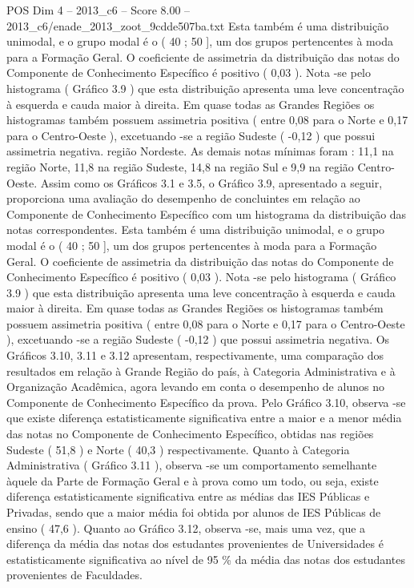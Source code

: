 \begin{textsample}{POS Dim 4 – 2013\_c6 – Score 8.00 – 2013\_c6/enade\_2013\_zoot\_9cdde507ba.txt}
Esta também é uma distribuição unimodal, e o grupo modal é o ( 40 ; 50 ], um dos grupos pertencentes à moda para a Formação Geral.
O coeficiente de assimetria da distribuição das notas do Componente de Conhecimento Específico é positivo ( 0,03 ).
Nota -se pelo histograma ( Gráfico 3.9 ) que esta distribuição apresenta uma leve concentração à esquerda e cauda maior à direita.
Em quase todas as Grandes Regiões os histogramas também possuem assimetria positiva ( entre 0,08 para o Norte e 0,17 para o Centro-Oeste ), excetuando -se a região Sudeste ( -0,12 ) que possui assimetria negativa. região Nordeste.
As demais notas mínimas foram : 11,1 na região Norte, 11,8 na região Sudeste, 14,8 na região Sul e 9,9 na região Centro-Oeste.
Assim como os Gráficos 3.1 e 3.5, o Gráfico 3.9, apresentado a seguir, proporciona uma avaliação do desempenho de concluintes em relação ao Componente de Conhecimento Específico com um histograma da distribuição das notas correspondentes.
Esta também é uma distribuição unimodal, e o grupo modal é o ( 40 ; 50 ], um dos grupos pertencentes à moda para a Formação Geral.
O coeficiente de assimetria da distribuição das notas do Componente de Conhecimento Específico é positivo ( 0,03 ).
Nota -se pelo histograma ( Gráfico 3.9 ) que esta distribuição apresenta uma leve concentração à esquerda e cauda maior à direita.
Em quase todas as Grandes Regiões os histogramas também possuem assimetria positiva ( entre 0,08 para o Norte e 0,17 para o Centro-Oeste ), excetuando -se a região Sudeste ( -0,12 ) que possui assimetria negativa.
Os Gráficos 3.10, 3.11 e 3.12 apresentam, respectivamente, uma comparação dos resultados em relação à Grande Região do país, à Categoria Administrativa e à Organização Acadêmica, agora levando em conta o desempenho de alunos no Componente de Conhecimento Específico da prova.
Pelo Gráfico 3.10, observa -se que existe diferença estatisticamente significativa entre a maior e a menor média das notas no Componente de Conhecimento Específico, obtidas nas regiões Sudeste ( 51,8 ) e Norte ( 40,3 ) respectivamente.
Quanto à Categoria Administrativa ( Gráfico 3.11 ), observa -se um comportamento semelhante àquele da Parte de Formação Geral e à prova como um todo, ou seja, existe diferença estatisticamente significativa entre as médias das IES Públicas e Privadas, sendo que a maior média foi obtida por alunos de IES Públicas de ensino ( 47,6 ).
Quanto ao Gráfico 3.12, observa -se, mais uma vez, que a diferença da média das notas dos estudantes provenientes de Universidades é estatisticamente significativa ao nível de 95 \% da média das notas dos estudantes provenientes de Faculdades.

\end{textsample}
